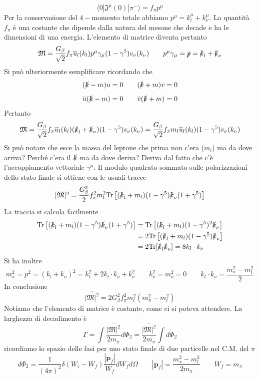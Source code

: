 $$
\langle 0 | \mathfrak{J}^\mu (0) | \pi^- \rangle = f_\pi p^\mu
$$
Per la conservazione del $4-$momento totale abbiamo $p^\mu=k_l^\mu+k_\nu^\mu$. La quantità $f_\pi$ è una costante che dipende dalla natura del mesone che decade e ha le dimensioni di una energia. L'elemento di matrice diventa pertanto
$$
\mathfrak{M} = \frac{G_\beta}{\sqrt{2}} f_\pi \overline{u}_l (k_l) p^\mu \gamma_\mu (1 - \gamma^5) v_\nu (k_\nu) \qquad p^\mu \gamma_\mu = \slashed{p} = \slashed{k}_l + \slashed{k}_\nu
$$
Si può ulteriormente semplificare ricordando che
$$
(\slashed{k} - m)u = 0 \quad \quad (\slashed{k} + m)v = 0
$$
$$
\overline{u}(\slashed{k} - m) = 0 \quad \quad \overline{v}(\slashed{k} + m) = 0
$$
Pertanto
$$
\mathfrak{M} = \frac{G_\beta}{\sqrt{2}} f_\pi \overline{u}_l (k_l) (\slashed{k}_l + \slashed{k}_\nu) (1 - \gamma^5) v_\nu (k_\nu) = \frac{G_\beta}{\sqrt{2}} f_\pi m_l \overline{u}_l (k_l) (1 - \gamma^5) v_\nu (k_\nu)
$$
Si può notare che esce la massa del leptone che prima non c'era ($m_l$) ma da dove arriva? Perché c'era il $\slashed{k}$ ma da dove deriva? Deriva dal fatto che c'è l'accoppiamento vettoriale $\gamma^\mu$. Il modulo quadrato sommato sulle polarizzazioni dello stato finale si ottiene con le usuali tracce
$$
\overline{|\mathfrak{M}|^2} = \frac{G_\beta^2}{2} f_\pi^2 m_l^2 \text{Tr} \left[ (\slashed{k}_l + m_l)(1 - \gamma^5) \slashed{k}_\nu (1 + \gamma^5) \right]
$$
La traccia si calcola facilmente
$$
\begin{aligned}
	\text{Tr} \left[ (\slashed{k}_l + m_l)(1 - \gamma^5) \slashed{k}_\nu (1 + \gamma^5) \right] &= \text{Tr} \left[ (\slashed{k}_l + m_l)(1 - \gamma^5)^2 \slashed{k}_\nu \right] \\
	&= 2 \text{Tr} \left[ (\slashed{k}_l + m_l)(1 - \gamma^5) \slashed{k}_\nu \right] \\
	&= 2 \text{Tr} [\slashed{k}_l \slashed{k}_\nu] = 8 k_l \cdot k_\nu
\end{aligned}
$$
Si ha inoltre
$$
m_\pi^2 = p^2 = (k_l + k_\nu)^2 = k_l^2 + 2 k_l \cdot k_\nu + k_\nu^2 \qquad k_\nu^2 = m_\nu^2 = 0 \qquad k_l \cdot k_\nu = \frac{m_\pi^2 - m_l^2}{2}
$$
In conclusione
$$
\overline{|\mathfrak{M}|^2} = 2 G_\beta^2 f_\pi^2 m_l^2 (m_\pi^2 - m_l^2)
$$
Notiamo che l'elemento di matrice è costante, come ci si poteva attendere. La larghezza di decadimento è
$$
\Gamma = \int \frac{\overline{|\mathfrak{M}|^2}}{2m_\pi} d\Phi_2 = \frac{\overline{|\mathfrak{M}|^2}}{2m_\pi} \int d\Phi_2
$$
ricordiamo lo spazio delle fasi per uno stato finale di due particelle nel C.M. del $\pi$
$$
d\Phi_2 = \frac{1}{(4\pi)^2} \delta(W_i - W_f) \frac{|\mathbf{p}_f|}{W_f} dW_f d\Omega \quad \quad |\mathbf{p}_f| = \frac{m_\pi^2 - m_l^2}{2m_\pi} \quad \quad W_f = m_\pi
$$
